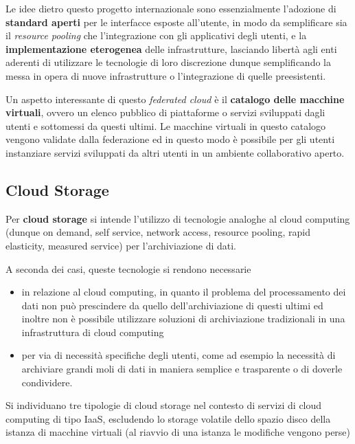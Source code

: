 Le idee dietro questo progetto internazionale sono essenzialmente
l'adozione di \textbf{standard aperti} per le interfacce esposte
all'utente, in modo da semplificare sia il \emph{resource pooling} che
l'integrazione con gli applicativi degli utenti, e la
\textbf{implementazione eterogenea} delle infrastrutture, lasciando
libertà agli enti aderenti di utilizzare le tecnologie di loro
discrezione dunque semplificando la messa in opera di nuove
infrastrutture o l'integrazione di quelle preesistenti.

Un aspetto interessante di questo \emph{federated cloud} è il
\textbf{catalogo delle macchine virtuali}, ovvero un elenco pubblico di
piattaforme o servizi sviluppati dagli utenti e sottomessi da questi
ultimi. Le macchine virtuali in questo catalogo vengono validate dalla
federazione ed in questo modo è possibile per gli utenti instanziare
servizi sviluppati da altri utenti in un ambiente collaborativo aperto.

\subsection{Cloud Storage}\label{cloud-storage}

Per \textbf{cloud storage} si intende l'utilizzo di tecnologie analoghe
al cloud computing (dunque on demand, self service, network access,
resource pooling, rapid elasticity, measured service) per
l'archiviazione di dati.

A seconda dei casi, queste tecnologie si rendono necessarie

\begin{itemize}
\tightlist
\item
  in relazione al cloud computing, in quanto il problema del
  processamento dei dati non può prescindere da quello
  dell'archiviazione di questi ultimi ed inoltre non è possibile
  utilizzare soluzioni di archiviazione tradizionali in una
  infrastruttura di cloud computing
\item
  per via di necessità specifiche degli utenti, come ad esempio la
  necessità di archiviare grandi moli di dati in maniera semplice e
  trasparente o di doverle condividere.
\end{itemize}

Si individuano tre tipologie di cloud storage nel contesto di servizi di
cloud computing di tipo IaaS, escludendo lo storage volatile dello
spazio disco della istanza di macchine virtuali (al riavvio di una
istanza le modifiche vengono perse)

